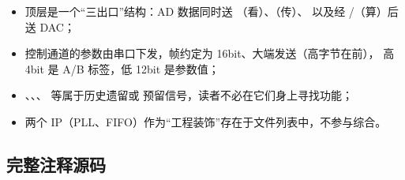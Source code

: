 \begin{itemize}[leftmargin=2em,itemsep=2pt]
\item 顶层是一个“三出口”结构：AD 数据同时送 （看）、（传）、
      以及经 /（算）后送 DAC；
\item 控制通道的参数由串口下发，帧约定为 16bit、大端发送（高字节在前），
      高 4bit 是 A/B 标签，低 12bit 是参数值；
\item {}、、、 等属于历史遗留或
      预留信号，读者不必在它们身上寻找功能；
\item 两个 IP（PLL、FIFO）作为“工程装饰”存在于文件列表中，不参与综合。
\end{itemize}

\subsection{完整注释源码}


